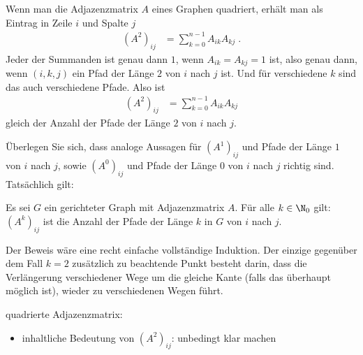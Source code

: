 Wenn man die Adjazenzmatrix $A$ eines Graphen quadriert, erhält man 
als Eintrag in Zeile $i$ und Spalte $j$
%
\begin{align*}
  (A^2)_{ij} &= \sum_{k=0}^{n-1} A_{ik}A_{kj}  \;.
\end{align*}
%
Jeder der Summanden ist genau dann $1$, wenn $A_{ik}=A_{kj}=1$ ist,
also genau dann, wenn $(i,k,j)$ ein Pfad der Länge $2$ von $i$ nach
$j$ ist. Und für verschiedene $k$ sind das auch verschiedene
Pfade. Also ist
%
\begin{align*}
  (A^2)_{ij} &= \sum_{k=0}^{n-1} A_{ik}A_{kj}
\end{align*}
%
gleich der Anzahl der Pfade der Länge $2$ von $i$ nach $j$.

Überlegen Sie sich, dass analoge Aussagen für $(A^1)_{ij}$ und Pfade
der Länge $1$ von $i$ nach $j$, sowie $(A^0)_{ij}$ und Pfade der Länge
$0$ von $i$ nach $j$ richtig sind. Tatsächlich gilt:

\begin{lemma}
  \label{lem:A-hoch-k}
  Es sei $G$ ein gerichteter Graph mit Adjazenzmatrix $A$. Für alle
  $k\in\N_0$ gilt: $(A^k)_{ij}$ ist die Anzahl der Pfade der Länge $k$
  in $G$ von $i$ nach $j$.
\end{lemma}
%
Der Beweis wäre eine recht einfache vollständige Induktion. Der
einzige gegenüber dem Fall $k=2$ zusätzlich zu beachtende Punkt
besteht darin, dass die Verlängerung verschiedener Wege um die gleiche
Kante (falls das überhaupt möglich ist), wieder zu verschiedenen Wegen
führt.
%
\begin{tutorium}
  quadrierte Adjazenzmatrix:
  \begin{itemize}
  \item inhaltliche Bedeutung von $(A^2)_{ij}$: unbedingt klar
    machen
  \end{itemize}
\end{tutorium}

